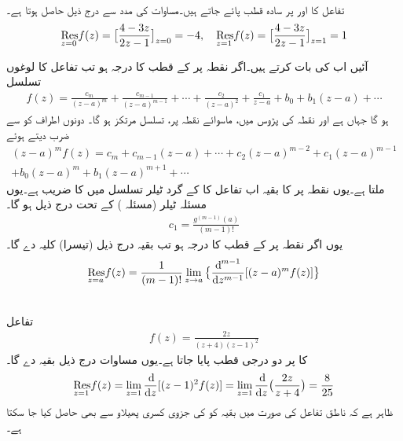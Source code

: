 \quad {}\\
تفاعل  کا  اور  پر سادہ قطب پائے جاتے ہیں۔مساوات کی مدد سے درج ذیل حاصل ہوتا ہے۔
\begin{align*}
\underset{z=0\hfill}{\Res} f(z)=\big[\frac{4-3z}{2z-1}\big]_{z=0}=-4,\quad \underset{z=1\hfill}{\Res} f(z) =\big[\frac{4-3z}{2z-1}\big]_{z=1}=1
\end{align*}

آئیں اب  کی بات کرتے ہیں۔اگر نقطہ  پر  کے قطب کا درجہ  ہو تب  تفاعل کا لوغوں تسلسل
\begin{align*}
f(z)=\frac{c_m}{(z-a)^m}+\frac{c_{m-1}}{(z-a)^{m-1}}+\cdots+\frac{c_2}{(z-a)^2}+\frac{c_1}{z-a}
+b_0+b_1(z-a)+\cdots
\end{align*}
ہو گا جہاں  ہے اور نقطہ  کی پڑوس میں، ماسوائے نقطہ  پر، تسلسل مرتکز ہو گا۔ دونوں اطراف کو  سے ضرب دیتے ہوئے 
\begin{multline*}
(z-a)^m f(z)=c_m+c_{m-1}(z-a)+\cdots+c_2(z-a)^{m-2}+c_1(z-a)^{m-1}\\
+b_0(z-a)^m+b_1(z-a)^{m+1}+\cdots
\end{multline*}
ملتا ہے۔یوں نقطہ  پر  کا بقیہ  اب تفاعل  کا  کے گرد  ٹیلر تسلسل میں  کا  ضریب  ہے۔یوں مسئلہ ٹیلر (مسئلہ ) کے تحت درج ذیل ہو گا۔
\begin{align*}
c_1=\frac{g^{(m-1)}(a)}{(m-1)!}
\end{align*}
یوں اگر نقطہ  پر  کے قطب کا درجہ  ہو تب بقیہ درج ذیل (تیسرا) کلیہ دے گا۔
\begin{align}\label{مساوات_بقیہ_تیسرا_کلیہ}
\underset{z=a\hfill}{\Res} f(z)=\frac{1}{(m-1)!}\lim_{z\to a}\big\{\frac{\dif^{\, m-1}}{\dif z^{m-1}}[(z-a)^mf(z)]\big\}
\end{align}

\quad {}\\
تفاعل
\begin{align*}
f(z)=\frac{2z}{(z+4)(z-1)^2}
\end{align*}
کا  پر دو درجی قطب پایا جاتا ہے۔یوں مساوات  درج ذیل بقیہ دے گا۔
\begin{align*}
\underset{z=1\hfill}{\Res} f(z)=\lim_{z=1}\frac{\dif}{\dif z}[(z-1)^2 f(z)]=\lim_{z=1}\frac{\dif}{\dif z}\big(\frac{2z}{z+4}\big)=\frac{8}{25}
\end{align*}
ظاہر ہے کہ ناطق تفاعل  کی صورت میں بقیہ کو  کی جزوی کسری پھیلاو سے بھی حاصل کیا جا سکتا ہے۔

